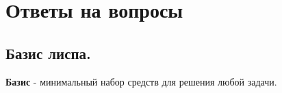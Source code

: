 \begin{figure}[ht!]
\end{figure}

\begin{figure}[ht!]
\end{figure}

\chapter{Ответы на вопросы}

\section{Базис лиспа.}

\textbf{Базис} - минимальный набор средств для решения любой задачи.

